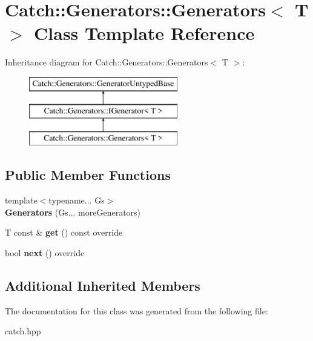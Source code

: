 \hypertarget{classCatch_1_1Generators_1_1Generators}{}\section{Catch\+::Generators\+::Generators$<$ T $>$ Class Template Reference}
\label{classCatch_1_1Generators_1_1Generators}
Inheritance diagram for Catch\+::Generators\+::Generators$<$ T $>$\+:\begin{figure}[H]
\begin{center}
\leavevmode
\includegraphics[height=3.000000cm]{classCatch_1_1Generators_1_1Generators}
\end{center}
\end{figure}
\subsection*{Public Member Functions}
\begin{DoxyCompactItemize}
\item 
\mbox{\label{classCatch_1_1Generators_1_1Generators_a0288170b30cd0fdfef6efc2d9bc8acba}} 
{\footnotesize template$<$typename... Gs$>$ }\\{\bfseries Generators} (Gs... more\+Generators)
\item 
\mbox{\label{classCatch_1_1Generators_1_1Generators_a66705482b7efa88cae6e6b7062d5de6a}} 
T const  \& {\bfseries get} () const override
\item 
\mbox{\label{classCatch_1_1Generators_1_1Generators_ad127fd2a07347b527f79ab3b78bd40fb}} 
bool {\bfseries next} () override
\end{DoxyCompactItemize}
\subsection*{Additional Inherited Members}


The documentation for this class was generated from the following file\+:\begin{DoxyCompactItemize}
\item 
catch.\+hpp\end{DoxyCompactItemize}
